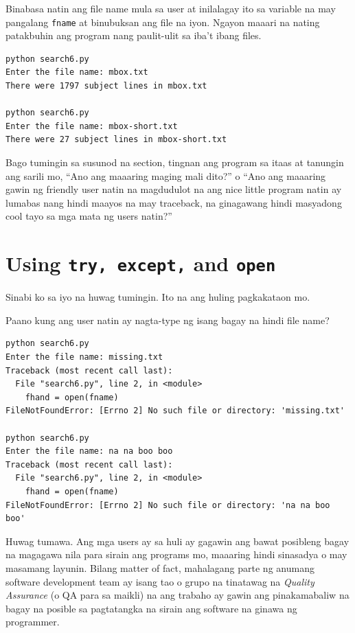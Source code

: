 \documentclass[10pt,]{book}
\begin{document}
Binabasa natin ang file name mula sa user at inilalagay ito sa variable
na may pangalang \texttt{fname} at binubuksan ang file na iyon. Ngayon
maaari na nating patakbuhin ang program nang paulit-ulit sa iba't ibang
files.

{\small
\begin{verbatim}
python search6.py
Enter the file name: mbox.txt
There were 1797 subject lines in mbox.txt

python search6.py
Enter the file name: mbox-short.txt
There were 27 subject lines in mbox-short.txt
\end{verbatim}
}

Bago tumingin sa susunod na section, tingnan ang program sa itaas at
tanungin ang sarili mo, ``Ano ang maaaring maging mali dito?'' o ``Ano
ang maaaring gawin ng friendly user natin na magdudulot na ang nice
little program natin ay lumabas nang hindi maayos na may traceback, na
ginagawang hindi masyadong cool tayo sa mga mata ng users natin?''

\section{\texorpdfstring{Using \texttt{try,\ except,} and
\texttt{open}}{Using try, except, and open}}\label{using-try-except-and-open}

Sinabi ko sa iyo na huwag tumingin. Ito na ang huling pagkakataon mo.

Paano kung ang user natin ay nagta-type ng isang bagay na hindi file
name?

{\small
\begin{verbatim}
python search6.py
Enter the file name: missing.txt
Traceback (most recent call last):
  File "search6.py", line 2, in <module>
    fhand = open(fname)
FileNotFoundError: [Errno 2] No such file or directory: 'missing.txt'

python search6.py
Enter the file name: na na boo boo
Traceback (most recent call last):
  File "search6.py", line 2, in <module>
    fhand = open(fname)
FileNotFoundError: [Errno 2] No such file or directory: 'na na boo boo'
\end{verbatim}
}

Huwag tumawa. Ang mga users ay sa huli ay gagawin ang bawat posibleng
bagay na magagawa nila para sirain ang programs mo, maaaring hindi
sinasadya o may masamang layunin. Bilang matter of fact, mahalagang
parte ng anumang software development team ay isang tao o grupo na
tinatawag na \emph{Quality Assurance} (o QA para sa maikli) na ang
trabaho ay gawin ang pinakamabaliw na bagay na posible sa pagtatangka na
sirain ang software na ginawa ng programmer.
\end{document}
